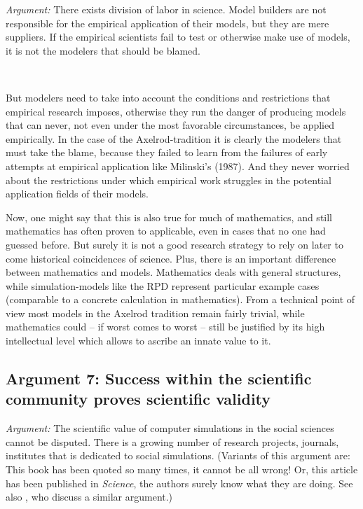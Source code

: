\documentclass[graybox, English]{svmult}
\begin{document}
{\em Argument:} There exists division of labor in science. Model
builders are not responsible for the empirical application of their
models, but they are mere suppliers. If the empirical scientists fail
to test or otherwise make use of models, it is not the modelers
that should be blamed.

\

 But modelers need to take into account the conditions
and restrictions that empirical research imposes, otherwise they run the
danger of producing models that can never, not even under the most
favorable circumstances, be applied empirically. In the case of the
Axelrod-tradition it is clearly the modelers that must take the blame,
because they failed to learn from the failures of early attempts at
empirical application like Milinski's (1987). And they never worried
about the restrictions under which empirical work struggles in the
potential application fields of their models.

Now, one might say that this is also true for much of mathematics, and
still mathematics has often proven to applicable, even in cases that
no one had guessed before. But surely it is not a good research
strategy to rely on later to come historical coincidences of
science. Plus, there is an important difference between mathematics
and models. Mathematics deals with general structures, while
simulation-models like the RPD represent particular example cases
(comparable to a concrete calculation in mathematics). From a
technical point of view most models in the Axelrod tradition remain
fairly trivial, while mathematics could -- if worst comes to worst --
still be justified by its high intellectual level which allows to
ascribe an innate value to it.

\subsection{Argument 7: Success within the scientific community proves scientific validity}

{\em Argument:} The scientific value of computer simulations in the
social sciences cannot be disputed. There is a growing number of
research projects, journals, institutes that is dedicated to social
simulations. (Variants of this argument are: This book has been quoted
so many times, it cannot be all wrong! Or, this article has been
published in {\em Science}, the authors surely know what they are doing. See
also \citet[195]{green-shapiro:1994}, who discuss a similar argument.)
\end{document}
